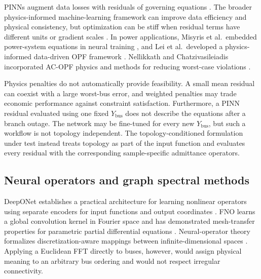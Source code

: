 \documentclass[final,5p,times,twocolumn]{elsarticle}
\begin{document}
PINNs augment data losses with residuals of governing equations
\cite{raissi2019pinn}. The broader physics-informed machine-learning framework
can improve data efficiency and physical consistency, but optimization can be
stiff when residual terms have different units or gradient scales
\cite{karniadakis2021piml}. In power applications, Misyris et al.\ embedded
power-system equations in neural training \cite{misyris2020pinn}, and Lei
et al.\ developed a physics-informed data-driven OPF framework
\cite{lei2021datadriven}. Nellikkath and Chatzivasileiadis incorporated AC-OPF
physics and methods for reducing worst-case violations
\cite{nellikkath2022acopf}.

Physics penalties do not automatically provide feasibility. A small mean
residual can coexist with a large worst-bus error, and weighted penalties may
trade economic performance against constraint satisfaction. Furthermore, a
PINN residual evaluated using one fixed $Y_{\mathrm{bus}}$ does not describe
the equations after a branch outage. The network may be fine-tuned for every
new $Y_{\mathrm{bus}}$, but such a workflow is not topology independent.
The topology-conditioned formulation under test instead treats topology as
part of the input function and evaluates every residual with the corresponding
sample-specific admittance operators.

\subsection{Neural operators and graph spectral methods}

DeepONet establishes a practical architecture for learning nonlinear operators
using separate encoders for input functions and output coordinates
\cite{lu2021deeponet}. FNO learns a global convolution kernel in Fourier space
and has demonstrated mesh-transfer properties for parametric partial
differential equations \cite{li2021fno}. Neural-operator theory formalizes
discretization-aware mappings between infinite-dimensional spaces
\cite{kova2023neuralop}. Applying a Euclidean FFT directly to buses, however,
would assign physical meaning to an arbitrary bus ordering and would not
respect irregular connectivity.
\end{document}

